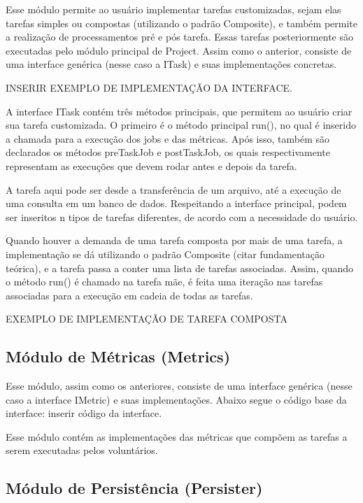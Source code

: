 \documentclass[12pt]{tcc}
\begin{document}
Esse módulo permite ao usuário implementar tarefas customizadas, sejam elas tarefas simples ou compostas (utilizando o padrão Composite), e também permite a realização de processamentos pré e pós tarefa. Essas tarefas posteriormente são executadas pelo módulo principal de Project.
Assim como o anterior, consiste de uma interface genérica (nesse caso a ITask) e suas implementações concretas. 

{{INSERIR EXEMPLO DE IMPLEMENTAÇÃO DA INTERFACE}}.

A interface ITask contém três métodos principais, que permitem ao usuário criar sua tarefa customizada. O primeiro é o método principal run(), no qual é inserido a chamada para a execução dos jobs e das métricas. Após isso, também são declarados os métodos preTaskJob e postTaskJob, os quais respectivamente representam as execuções que devem rodar antes e depois da tarefa.

A tarefa aqui pode ser desde a transferência de um arquivo, até a execução de uma consulta em um banco de dados. Respeitando a interface principal, podem ser inseritos n tipos de tarefas diferentes, de acordo com a necessidade do usuário.

Quando houver a demanda de uma tarefa composta por mais de uma tarefa, a implementação se dá utilizando o padrão Composite (citar fundamentação teórica), e a tarefa passa a conter uma lista de tarefas associadas. Assim, quando o método run() é chamado na tarefa mãe, é feita uma iteração nas tarefas associadas para a execução em cadeia de todas as tarefas. 

{{EXEMPLO DE IMPLEMENTAÇÃO DE TAREFA COMPOSTA}}

\subsection{Módulo de Métricas (Metrics)}

Esse módulo, assim como os anteriores, consiste de uma interface genérica (nesse caso a interface IMetric) e suas implementações. Abaixo segue o código base da interface: {inserir código da interface}.

Esse módulo contém as implementações das métricas que compõem as tarefas a serem executadas pelos voluntários.

\subsection{Módulo de Persistência (Persister)}
\end{document}
